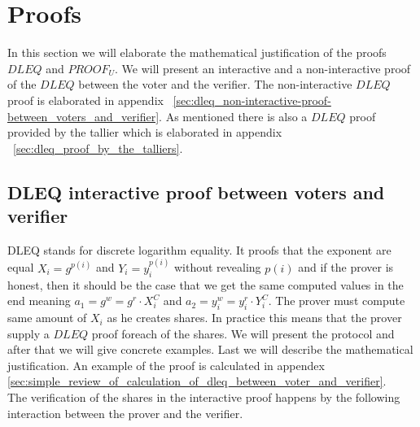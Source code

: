 \section{Proofs} \label{sec:proofs}
In this section we will elaborate the mathematical justification of the proofs $DLEQ$ and $PROOF_U$. We will present an interactive and a non-interactive proof of the $DLEQ$ between the voter and the verifier. The non-interactive $DLEQ$ proof is elaborated in appendix ~\ref{sec:dleq_non-interactive-proof-between_voters_and_verifier}. As mentioned there is also a $DLEQ$ proof provided by the tallier which is elaborated in appendix ~\ref{sec:dleq_proof_by_the_talliers}.

\subsection{DLEQ interactive proof between voters and verifier} \label{sec:dleq_voter_verifier}
DLEQ stands for discrete logarithm equality. It proofs that the exponent are equal $X_i=g^{p(i)}$ and  $Y_i=y_i^{p(i)}$ without revealing \begin{math}{p(i)} \end{math} and if the prover is honest, then it should be the case that we get the same computed values in the end meaning $a_1 = g^w= g^r \cdot X_i^C$ and $a_2= y_i^w = y_i^r \cdot Y_i^C$. The prover must compute same amount of $X_i$ as he creates shares. In practice this means that the prover supply a $DLEQ$ proof foreach of the shares. We will present the protocol and after that we will give concrete examples. Last we will describe the mathematical justification. An example of the proof is calculated in appendex \ref{sec:simple_review_of_calculation_of_dleq_between_voter_and_verifier}. \\

\noindent
The verification of the shares in the interactive proof happens by the following  interaction between the prover and the verifier.


